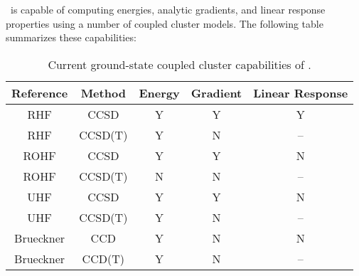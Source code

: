 \PSIthree\ is capable of computing energies, analytic gradients, and
linear response properties using a number of coupled cluster models.
The following table summarizes these capabilities:
\begin{table}
\begin{center}
\begin{tabular}{ccccc}
\hline
\hline
Reference & Method & Energy    & Gradient  &   Linear Response \\
\hline
RHF       & CCSD    & Y & Y & Y   \\
RHF       & CCSD(T) & Y & N & --  \\
ROHF      & CCSD    & Y & Y & N   \\
ROHF      & CCSD(T) & N & N & --  \\
UHF       & CCSD    & Y & Y & N   \\
UHF       & CCSD(T) & Y & N & --  \\
Brueckner & CCD     & Y & N & N   \\
Brueckner & CCD(T)  & Y & N & --  \\
\hline
\hline
\end{tabular}
\end{center}
\caption{Current ground-state coupled cluster capabilities of \PSIthree.}
\end{table}

